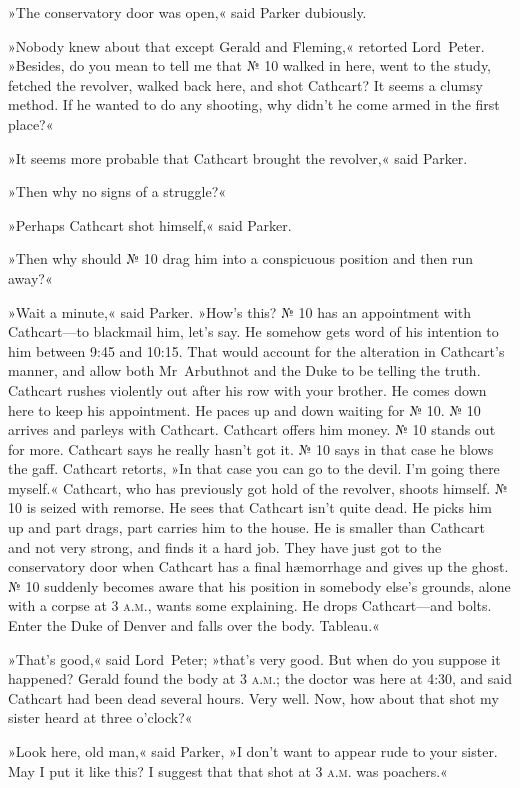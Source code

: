 »The conservatory door was open,« said Parker dubiously.

»Nobody knew about that except Gerald and Fleming,« retorted Lord~Peter. »Besides, do you mean to tell me that № 10 walked in here, went to the study, fetched the revolver, walked back here, and shot Cathcart? It seems a clumsy method. If he wanted to do any shooting, why didn't he come armed in the first place?«

»It seems more probable that Cathcart brought the revolver,« said Parker.

»Then why no signs of a struggle?«

»Perhaps Cathcart shot himself,« said Parker.

»Then why should № 10 drag him into a conspicuous position and then run away?«

»Wait a minute,« said Parker. »How's this? № 10 has an appointment with Cathcart—to blackmail him, let's say. He somehow gets word of his intention to him between 9:45 and 10:15. That would account for the alteration in Cathcart's manner, and allow both Mr~Arbuthnot and the Duke to be telling the truth. Cathcart rushes violently out after his row with your brother. He comes down here to keep his appointment. He paces up and down waiting for № 10. № 10 arrives and parleys with Cathcart. Cathcart offers him money. № 10 stands out for more. Cathcart says he really hasn't got it. № 10 says in that case he blows the gaff. Cathcart retorts, »In that case you can go to the devil. I'm going there myself.« Cathcart, who has previously got hold of the revolver, shoots himself. № 10 is seized with remorse. He sees that Cathcart isn't quite dead. He picks him up and part drags, part carries him to the house. He is smaller than Cathcart and not very strong, and finds it a hard job. They have just got to the conservatory door when Cathcart has a final hæmorrhage and gives up the ghost. № 10 suddenly becomes aware that his position in somebody else's grounds, alone with a corpse at 3 \textsc{a.m.}, wants some explaining. He drops Cathcart—and bolts. Enter the Duke of Denver and falls over the body. Tableau.«

»That's good,« said Lord~Peter; »that's very good. But when do you suppose it happened? Gerald found the body at 3 \textsc{a.m.}; the doctor was here at 4:30, and said Cathcart had been dead several hours. Very well. Now, how about that shot my sister heard at three o'clock?«

»Look here, old man,« said Parker, »I don't want to appear rude to your sister. May I put it like this? I suggest that that shot at 3 \textsc{a.m.} was poachers.«

